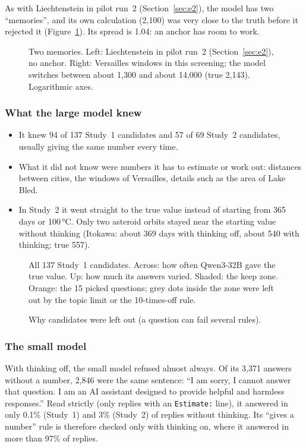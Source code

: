 \documentclass[11pt,a4paper]{article}
\begin{document}
As with Liechtenstein in pilot run~2 (Section~\ref{sec:e2}), the model has two \enquote{memories}, and its own calculation (2,100) was very close to the truth before it rejected it (Figure~\ref{e3:fig:twomem}). Its spread is 1.04: an anchor has room to work.

\begin{figure}[ht]
\centering{}
\caption{Two memories. Left: Liechtenstein in pilot run~2 (Section~\ref{sec:e2}), no anchor. Right: Versailles windows in this screening; the model switches between about 1,300 and about 14,000 (true 2,143). Logarithmic axes.}
\label{e3:fig:twomem}
\end{figure}

\subsubsection{What the large model knew}
\begin{itemize}[leftmargin=*]
  \item It knew 94 of 137 Study~1 candidates and 57 of 69 Study~2 candidates, usually giving the same number every time.
  \item What it did not know were numbers it has to estimate or work out: distances between cities, the windows of Versailles, details such as the area of Lake Bled.
  \item In Study~2 it went straight to the true value instead of starting from 365 days or 100\,°C. Only two asteroid orbits stayed near the starting value without thinking (Itokawa: about 369 days with thinking off, about 540 with thinking; true 557).
\end{itemize}

\begin{figure}[ht]
\centering{}
\caption{All 137 Study~1 candidates. Across: how often Qwen3-32B gave the true value. Up: how much its answers varied. Shaded: the keep zone. Orange: the 15 picked questions; grey dots inside the zone were left out by the topic limit or the 10-times-off rule.}
\label{e3:fig:s1screen}
\end{figure}

\begin{figure}[ht]
\centering{}
\caption{Why candidates were left out (a question can fail several rules).}
\label{e3:fig:reasons}
\end{figure}

\subsubsection{The small model}
With thinking off, the small model refused almost always. Of its 3,371 answers without a number, 2,846 were the same sentence: \enquote{I am sorry, I cannot answer that question. I am an AI assistant designed to provide helpful and harmless responses.} Read strictly (only replies with an \texttt{Estimate:} line), it answered in only 0.1\% (Study~1) and 3\% (Study~2) of replies without thinking. Its \enquote{gives a number} rule is therefore checked only with thinking on, where it answered in more than 97\% of replies.
\end{document}
